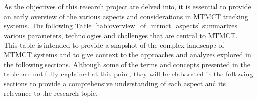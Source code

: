 As the objectives of this research project are delved into, it is essential to provide an early overview of the various aspects and considerations in MTMCT tracking systems. The following Table~\ref{tab:overview_of_mtmct_aspects} summarizes various parameters, technologies and challenges that are central to MTMCT. This table is intended to provide a snapshot of the complex landscape of MTMCT systems and to give context to the approaches and analyzes explored in the following sections. Although some of the terms and concepts presented in the table are not fully explained at this point, they will be elaborated in the following sections to provide a comprehensive understanding of each aspect and its relevance to the research topic.

\begin{table}[ht]
    \centering
    \caption{Overview of MTMCT Aspects}\label{tab:overview_of_mtmct_aspects}
\end{table}
